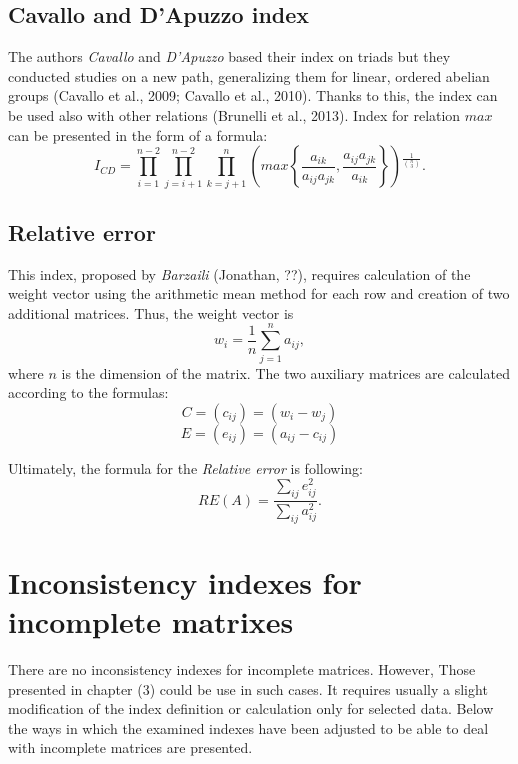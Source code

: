 \subsection{Cavallo and D’Apuzzo index}

The authors \textit{Cavallo} and \textit{D'Apuzzo} based their index on triads but they conducted studies on a new path, generalizing them for linear, ordered abelian groups (Cavallo et al., 2009; Cavallo et al., 2010). Thanks to this, the index can be used also with other relations (Brunelli et al., 2013). Index for relation $max$ can be presented in the form of a formula:
	\begin{equation} 
		I_{CD}=\prod_{i=1}^{n-2}\prod_{j=i+1}^{n-2}\prod_{k=j+1}^{n}\left(max\left\{ \frac{a_{ik}}{a_{ij}a_{jk}},\frac{a_{ij}a_{jk}}{a_{ik}}\right\} \right){}^{\frac{1}{\binom{n}{3}}}.
	 \end{equation}
 

\subsection{Relative error}

This index, proposed by \textit{Barzaili} (Jonathan, ??), requires calculation of the weight vector using the arithmetic mean method for each row and creation of two additional matrices. Thus, the weight vector is $$w_{i}=\frac{1}{n}\sum_{j=1}^{n}a_{ij},$$ where $n$ is the dimension of the matrix. The two auxiliary matrices are calculated according to the formulas:
$$C=\left(c_{ij}\right)=\left(w_{i}-w_{j}\right)$$
$$E=\left(e_{ij}\right)=\left(a_{ij}-c_{ij}\right)$$

Ultimately, the formula for the \textit{Relative error} is following:
	\begin{equation} 
		RE(A)=\frac{\sum_{ij}e_{ij}^{2}}{\sum_{ij}a_{ij}^{2}}.
	 \end{equation}


\section{Inconsistency indexes for incomplete matrixes}
\label{sec:inconsistencyIndexesForIncompleteMatrices}

There are no inconsistency indexes for incomplete matrices. However, Those presented in chapter (3) could be use in such cases. It requires usually a slight modification of the index definition or calculation only for selected data. Below the ways in which the examined indexes have been adjusted to be able to deal with incomplete matrices are presented.

